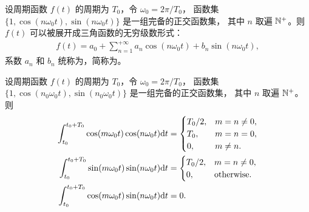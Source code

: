\begin{definition}[三角形式傅里叶级数]
    设周期函数 $f(t)$ 的周期为 $T_0$，令 $\omega_0 = 2\pi/T_0$，
    函数集 $\{1, \cos(n\omega_0 t), \sin(n\omega_0 t)\}$ 是一组完备的正交函数集，
    其中 $n$ 取遍 $\mathbb{N}^{+}$。则 $f(t)$ 可以被展开成三角函数的无穷级数形式：
    \begin{align*}
        f(t) = a_0 + \sum_{n = 1}^{+\infty}a_n\cos(n\omega_0 t) + b_n\sin(n\omega_0 t),
    \end{align*}
    系数 $a_n$ 和 $b_n$ 统称为，简称为。
\end{definition}

\begin{lemma}
    设周期函数 $f(t)$ 的周期为 $T_0$，令 $\omega_0 = 2\pi/T_0$，
    函数集 $\{1, \cos(n_0\omega_0 t), \sin(n_0\omega_0 t)\}$ 是一组完备的正交函数集，
    其中 $n$ 取遍 $\mathbb{N}^{+}$。则
    \begin{align*}
        \int_{t_0}^{t_0 + T_0}\cos(m\omega_0 t)\cos (n\omega_0 t)\mathrm{d}t & = \begin{cases}
            T_0 / 2, & m = n \neq 0, \\
            T_0, & m = n = 0, \\
            0, & m \neq n.
        \end{cases} \\
        \int_{t_0}^{t_0 + T_0}\sin(m\omega_0 t)\sin (n\omega_0 t)\mathrm{d}t & = \begin{cases}
            T_0 / 2, & m = n \neq 0, \\
            0, & \text{otherwise}.
        \end{cases} \\
        \int_{t_0}^{t_0 + T_0}\cos(m\omega_0 t)\sin (n\omega_0 t)\mathrm{d}t & = 0.
    \end{align*}
\end{lemma}

